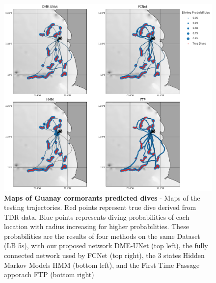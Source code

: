 \documentclass{article}
\begin{document}
\begin{figure}[h]
  \centering
  \includegraphics[scale=0.5]{figure4b.png}
  \caption{\textbf{Maps of Guanay cormorants predicted dives} - Maps of the testing trajectories. Red points represent true dive derived from TDR data. Blue points represents diving probabilities of each location with radius increasing for higher probabilities. These probabilities are the results of four methods on the same Dataset (LB 5s), with our proposed network DME-UNet (top left), the fully connected network used by \cite{browning_predicting_2018}  FCNet (top right), the 3 states Hidden Markov Models HMM (bottom left), and the First Time Passage apporach FTP (bottom right)}
  \label{figure4b}
\end{figure}
\end{document}
